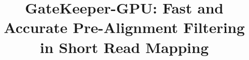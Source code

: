 \documentclass[10pt,journal,compsoc]{IEEEtran}
\begin{document}

%
\title{GateKeeper-GPU: Fast and Accurate Pre-Alignment Filtering in Short Read Mapping}
%
%
%
%
\end{document}
